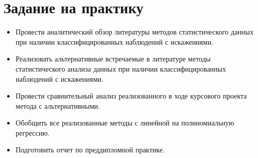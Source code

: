\section*{Задание на практику}
{}
\begin{itemize}
    \item Провести аналитический обзор литературы методов статистического данных при наличии классифицированных наблюдений с искажениями.
    \item Реализовать альтернативные встречаемые в литературе методы статистического анализа данных при наличии классифицированных наблюдений с искажениями.
    \item Провести сравнительный анализ реализованного в ходе курсового проекта метода с альтернативными.
    \item Обобщить все реализованные методы с линейной на полиномиальную регрессию.
    \item Подготовить отчет по преддипломной практике.
\end{itemize}